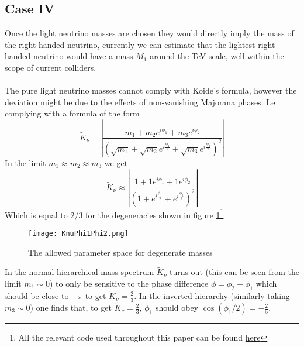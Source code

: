 \documentclass[twoside,twocolumn,11pt]{article} %
\begin{document}
\subsection*{Case IV}
Once the light neutrino masses are chosen they would directly imply the mass of the right-handed neutrino, currently we can estimate that the lightest right-handed neutrino would have a mass $M_1$ around the TeV scale, well within the scope of current colliders.\\\\
The pure light neutrino masses cannot comply with Koide's formula, however the deviation might be due to the effects of non-vanishing Majorana phases. I.e complying with a formula of the form
\begin{equation}
	\tilde{K}_{\nu} = \left|\frac{m_1 + m_2 e^{i\phi_1} + m_3 e^{i\phi_2}}{(\sqrt{m_1} + \sqrt{m_2} e^{i\frac{\phi_1}{2}} + \sqrt{m_3}e^{i\frac{\phi_2}{2}})^2}\right|
\end{equation}
In the limit $m_1\approx m_2 \approx m_3$ we get
\begin{equation}
	\tilde{K}_{\nu} \approx \left|\frac{1 + 1e^{i\phi_1} + 1e^{i\phi_2}}{(1 + e^{i\frac{\phi_1}{2}} + e^{i\frac{\phi_2}{2}})^2}\right|
\end{equation}
Which is equal to 2/3 for the degeneracies shown in figure \ref{fig:KnuPhi1Phi2}\footnote{All the relevant code used throughout this paper can be found \href{https://github.com/arthuradriaens-code/Electroweak-and-strong-force}{here}}
\begin{figure}
	\texttt{[image: KnuPhi1Phi2.png]}
	\caption{The allowed parameter space for degenerate masses}
	\label{fig:KnuPhi1Phi2}
\end{figure}
In the normal hierarchical mass spectrum $\tilde{K}_\nu$ turns out (this can be seen from the limit $m_1\sim 0$) to only be sensitive to the phase difference  $\phi=\phi_2-\phi_1$ which should be close to $-\pi$  to get $\tilde{K}_\nu = \frac{2}{3}$. In the inverted hierarchy (similarly taking $m_3\sim 0$) one finds that, to get $\tilde{K}_{\nu}=\frac{2}{3}$, $\phi_1$ should obey $\cos(\phi_1/2) = -\frac{2}{5}$.
\end{document}
